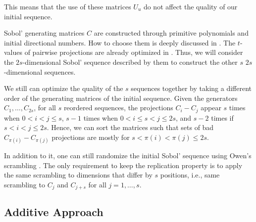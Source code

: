 \documentclass[]{elsarticle}
\theoremstyle{definition}
\def\abs#1{\ensuremath{\left \lvert #1 \right \rvert}}
\begin{document}
This means that the use of these matrices $U_u$ do not affect the quality of our initial sequence.

Sobol' generating matrices $C$ are constructed through primitive polynomials and initial directional numbers. How to choose them is deeply discussed in \cite{kuo}. The $t$-values of pairwise projections are already optimized in \cite{kuo2}. Thus, we will consider the $2s$-dimensional Sobol' sequence described by them to construct the other $s$ $2s$-dimensional sequences.

We still can optimize the quality of the $s$ sequences together by taking a different order of the generating matrices of the initial sequence. Given the generators $C_1,\dots,C_{2s}$, for all $s$ reordered sequences, the projections $C_i-C_j$ appear $s$ times when $0<i<j\leq s$, $s-1$ times when $0<i\leq s<j\leq 2s$, and $s-2$ times if $s<i<j\leq 2s$. Hence, we can sort the matrices such that sets of bad $C_{\pi(i)}-C_{\pi(j)}$ projections are mostly for $s<{\pi(i)}<{\pi(j)}\leq 2s$.

In addition to it, one can still randomize the initial Sobol' sequence using Owen's scrambling \cite{owen.scrambl}. The only requirement to keep the replication property is to apply the same scrambling to dimensions that differ by $s$ positions, i.e., same scrambling to $C_j$ and $C_{j+s}$ for all $j=1,\dots,s$.

%
%
%

%


\subsection{Additive Approach}
\end{document}
